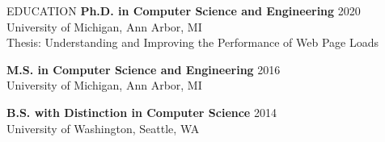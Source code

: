 \documentclass{resume}
\begin{document}
\begin{rSection}{EDUCATION}
  \textbf{Ph.D. in Computer Science and Engineering} \hfill 2020\\
	University of Michigan, Ann Arbor, MI\\
  Thesis: Understanding and Improving the Performance of Web Page Loads

  \textbf{M.S. in Computer Science and Engineering} \hfill 2016\\
	University of Michigan, Ann Arbor, MI

  \textbf{B.S. with Distinction in Computer Science} \hfill 2014\\
	University of Washington, Seattle, WA

\end{rSection} %

\end{document}
